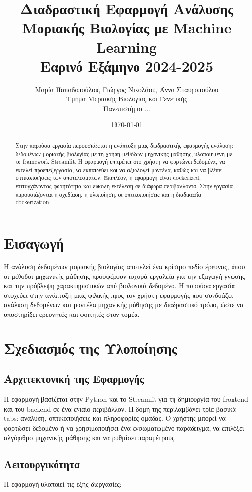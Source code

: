 \documentclass[a4paper,12pt]{article}
\title{ 
  \textbf{Διαδραστική Εφαρμογή Ανάλυσης Μοριακής Βιολογίας με Machine Learning} \\
  \large Εαρινό Εξάμηνο 2024-2025
}
\author{
  Μαρία Παπαδοπούλου, Γιώργος Νικολάου, Άννα Σταυροπούλου \\
  Τμήμα Μοριακής Βιολογίας και Γενετικής \\
  Πανεπιστήμιο ...
}
\date{\today}
\begin{document}
\maketitle


\begin{abstract}
Στην παρούσα εργασία παρουσιάζεται η ανάπτυξη μιας διαδραστικής εφαρμογής ανάλυσης δεδομένων μοριακής βιολογίας με τη χρήση μεθόδων μηχανικής μάθησης, υλοποιημένη με το framework Streamlit. Η εφαρμογή επιτρέπει στο χρήστη να φορτώνει δεδομένα, να εκτελεί προεπεξεργασία, να εκπαιδεύει και να αξιολογεί μοντέλα, καθώς και να βλέπει οπτικοποιήσεις των αποτελεσμάτων. Επιπλέον, η εφαρμογή είναι dockerized, επιτυγχάνοντας φορητότητα και εύκολη εκτέλεση σε διάφορα περιβάλλοντα. Στην εργασία παρουσιάζονται η σχεδίαση, η υλοποίηση, οι οπτικοποιήσεις και η διαδικασία dockerization.
\end{abstract}

\section{Εισαγωγή}
Η ανάλυση δεδομένων μοριακής βιολογίας αποτελεί ένα κρίσιμο πεδίο έρευνας, όπου οι μέθοδοι μηχανικής μάθησης προσφέρουν ισχυρά εργαλεία για την εξαγωγή γνώσης και την πρόβλεψη χαρακτηριστικών από βιολογικά δεδομένα. Η παρούσα εργασία στοχεύει στην ανάπτυξη μιας φιλικής προς τον χρήστη εφαρμογής που συνδυάζει ανάλυση δεδομένων και μοντέλα μηχανικής μάθησης με διαδραστικό τρόπο, ώστε να υποστηρίξει ερευνητές και φοιτητές στον τομέα.

\section{Σχεδιασμός της Υλοποίησης}

\subsection{Αρχιτεκτονική της Εφαρμογής}
Η εφαρμογή βασίζεται στην Python και το Streamlit για τη δημιουργία του frontend και του backend σε ένα ενιαίο περιβάλλον. Η δομή της περιλαμβάνει τρία βασικά tabs: ανάλυση, οπτικοποιήσεις και πληροφορίες ομάδας. Ο χρήστης μπορεί να φορτώσει δεδομένα ή να χρησιμοποιήσει ένα ενσωματωμένο παράδειγμα, να επιλέξει αλγόριθμο μηχανικής μάθησης και να ρυθμίσει παραμέτρους.

\subsection{Λειτουργικότητα}
Η εφαρμογή υλοποιεί τις εξής διεργασίες:
\end{document}
